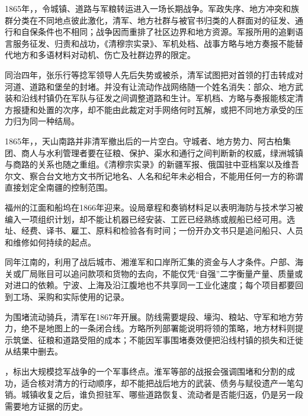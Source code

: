1865年，，令城镇、道路与军粮转运进入一场长期战争。军政失序、地方冲突和族群分类在不同地点彼此激化，清军、地方社群与被官书归类的人群面对的征发、通行和自保条件也不相同；战争因而重排了社区边界和地方资源。军报所用的追剿语言服务征发、归责和战功，《清穆宗实录》、军机处档、战事方略与地方奏报不能替代地方和多语材料对动机、伤亡及社群边界的限定。

同治四年，张乐行等捻军领导人先后失势或被杀，清军试图把对首领的打击转成对河道、道路和堡垒的封堵。并没有让流动作战网络随一个姓名消失：部众、地方武装和沿线村镇仍在军队与征发之间调整道路和生计。军机档、方略与奏报能核定清方报捷和处置的次序，却不能由此裁定对手网络何时瓦解，或把不同地方承受的压力归为同一种结局。

1865年，，天山南路并非清军撤出后的一片空白。守城者、地方势力、阿古柏集团、商人与水利管理者要在征粮、保护、渠水和通行之间判断新的权威，绿洲城镇与商路的关系也随之重组。《清穆宗实录》的新疆军报、俄国驻中亚档案以及维吾尔文、察合台文地方文书所记地名、人名和纪年未必相合，不能用任何一方的称谓直接划定全南疆的控制范围。

福州的江面和船坞在1866年迎来。设局章程和奏销材料足以表明海防与技术学习被编入一项组织计划，却不能让机器已经安装、工匠已经熟练或舰船已经可用。选址、经费、译书、雇工、原料和检验各有时间；一份开办文书只是追问船只、人员和维修如何持续的起点。

同年江南的，利用了战后城市、湘淮军和口岸所汇集的资金与人才条件。户部、海关或厂局账目可以追问款项和货物的去向，不能仅凭“自强”二字衡量产量、质量或对进口的依赖。宁波、上海及沿江腹地也不共享同一工业化速度；每个项目都要回到工场、采购和实际使用的记录。

为围堵流动骑兵，清军在1867年开展。防线需要堤段、壕沟、粮站、守军和地方劳力，绝不是地图上的一条闭合线。方略所列部署能说明将领的策略，地方材料则提示筑堡、征粮和道路受阻的成本；不能因军事围堵奏效便把沿线村镇的损失和迁徙从结果中删去。

，标出大规模捻军战争的一个军事终点。淮军等部的战报会强调围堵和分割的成功，适合核对清方的行动顺序，却不能把战后地方的武装、债务与赋役遗产一笔勾销。城镇收复之后，谁负担驻军、哪些道路恢复、流动者是否能归返，仍是另一段需要地方证据的历史。

